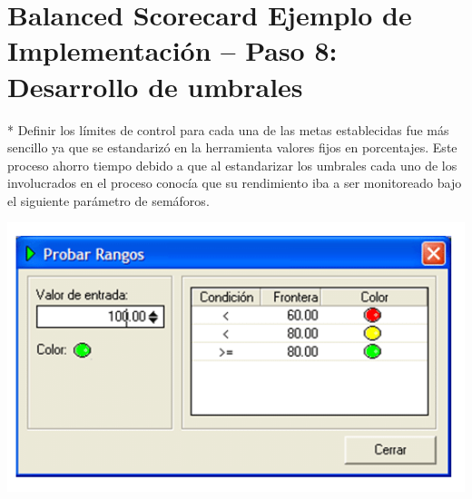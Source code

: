 \section{Balanced Scorecard Ejemplo de Implementación – Paso 8: Desarrollo de umbrales}
\item {* Definir los límites de control para cada una de las metas establecidas fue más sencillo ya que se estandarizó en la herramienta valores fijos en porcentajes. Este proceso ahorro tiempo debido a que al estandarizar los umbrales cada uno de los involucrados en el proceso conocía que su rendimiento iba a ser monitoreado bajo el siguiente parámetro de semáforos.}
\begin{center}
\includegraphics[width=15cm]{./Imagenes/img01.png}
\end{center}
